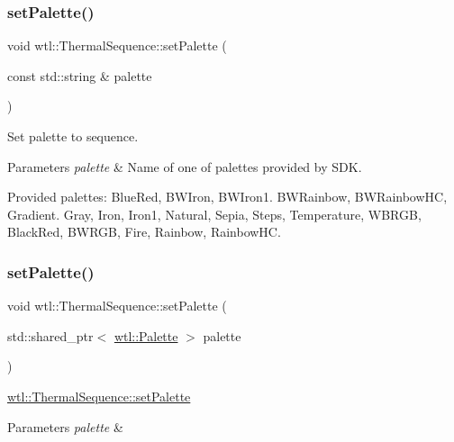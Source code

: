 \subsubsection{\texorpdfstring{set\+Palette()}{setPalette()}\hspace{0.1cm}{\footnotesize\ttfamily [1/2]}}
{\footnotesize\ttfamily void wtl\+::\+Thermal\+Sequence\+::set\+Palette (\begin{DoxyParamCaption}\item[{const std\+::string \&}]{palette }\end{DoxyParamCaption})}



Set palette to sequence. 


\begin{DoxyParams}{Parameters}
{\em palette} & Name of one of palettes provided by S\+DK.\\
\hline
\end{DoxyParams}
Provided palettes\+: Blue\+Red, B\+W\+Iron, B\+W\+Iron1. B\+W\+Rainbow, B\+W\+Rainbow\+HC, Gradient. Gray, Iron, Iron1, Natural, Sepia, Steps, Temperature, W\+B\+R\+GB, Black\+Red, B\+W\+R\+GB, Fire, Rainbow, Rainbow\+HC. \mbox{\label{classwtl_1_1_thermal_sequence_a5535a6cf8de61dbcf0c3d49f186c7370}} 
\subsubsection{\texorpdfstring{set\+Palette()}{setPalette()}\hspace{0.1cm}{\footnotesize\ttfamily [2/2]}}
{\footnotesize\ttfamily void wtl\+::\+Thermal\+Sequence\+::set\+Palette (\begin{DoxyParamCaption}\item[{std\+::shared\+\_\+ptr$<$ \hyperlink{classwtl_1_1_palette}{wtl\+::\+Palette} $>$}]{palette }\end{DoxyParamCaption})}



\hyperlink{classwtl_1_1_thermal_sequence_a47103fe0b8c101c0d2b77499f464de93}{wtl\+::\+Thermal\+Sequence\+::set\+Palette} 


\begin{DoxyParams}{Parameters}
{\em palette} & \\
\hline
\end{DoxyParams}
\mbox{\label{classwtl_1_1_thermal_sequence_afa7db744c4112df11b20026eae1da399}} 
